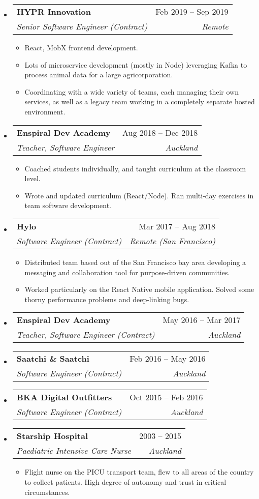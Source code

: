 \documentclass[12pt]{article}
\makeatletter
\def \entryspacing {-0em}
\newcommand{\resumeEntryStart}{\begin{itemize}[leftmargin=2.5mm]}
\newcommand{\resumeEntryEnd}{\end{itemize}\vspace{\entryspacing}}
\newcommand{\resumeItemListStart}{\begin{itemize}[leftmargin=4.5mm]}
\newcommand{\resumeItemListEnd}{\end{itemize}}
\newcommand{\resumeItem}[1]{
  \item\small{
    {#1 \vspace{-0.9ex}}
  }
}
\newcommand{\resumeEntryTSDL}[4]{
  \vspace{-0.5ex}\item[]
    \begin{tabularx}{0.97\textwidth}{X@{\hspace{5em}}r}
      \textbf{\color{primary}#1} & {\firabook\color{accent}\small#2} \\
      \textit{\color{accent}\small#3} & \textit{\color{accent}\small#4} \\
    \end{tabularx}\vspace{-0.9ex}
}
\makeatother
\begin{document}
  \resumeEntryStart
    \resumeEntryTSDL
      {HYPR Innovation}{Feb 2019 -- Sep 2019}
      {Senior Software Engineer (Contract)}{Remote}
    \resumeItemListStart
      \resumeItem {React, MobX frontend development.}
      \resumeItem {Lots of microservice development (mostly in Node) leveraging Kafka to process animal data for a large agricorporation.}
      \resumeItem {Coordinating with a wide variety of teams, each managing their own services, as well as a legacy team working in a completely separate hosted environment.}
    \resumeItemListEnd
  \resumeEntryEnd

  \resumeEntryStart
    \resumeEntryTSDL
      {Enspiral Dev Academy}{Aug 2018 -- Dec 2018}
      {Teacher, Software Engineer}{Auckland}
    \resumeItemListStart
      \resumeItem {Coached students individually, and taught curriculum at the classroom level.}
      \resumeItem {Wrote and updated curriculum (React/Node). Ran multi-day exercises in team software development.}
    \resumeItemListEnd
  \resumeEntryEnd

  \resumeEntryStart
    \resumeEntryTSDL
      {Hylo}{Mar 2017 -- Aug 2018}
      {Software Engineer (Contract)}{Remote (San Francisco)}
    \resumeItemListStart
      \resumeItem {Distributed team based out of the San Francisco bay area developing a messaging and collaboration tool for purpose-driven communities.}
      \resumeItem {Worked particularly on the React Native mobile application. Solved some thorny performance problems and deep-linking bugs.}
    \resumeItemListEnd
  \resumeEntryEnd

  \resumeEntryStart
    \resumeEntryTSDL
      {Enspiral Dev Academy}{May 2016 -- Mar 2017}
      {Teacher, Software Engineer (Contract)}{Auckland}
  \resumeEntryEnd

  \resumeEntryStart
    \resumeEntryTSDL
      {Saatchi \& Saatchi}{Feb 2016 -- May 2016}
      {Software Engineer (Contract)}{Auckland}
  \resumeEntryEnd

  \resumeEntryStart
    \resumeEntryTSDL
      {BKA Digital Outfitters}{Oct 2015 -- Feb 2016}
      {Software Engineer (Contract)}{Auckland}
  \resumeEntryEnd


  \resumeEntryStart
    \resumeEntryTSDL
      {Starship Hospital}{2003 -- 2015}
      {Paediatric Intensive Care Nurse}{Auckland}
    \resumeItemListStart
      \resumeItem {Flight nurse on the PICU transport team, flew to all areas of the country to collect patients. High degree of autonomy and trust in critical circumstances.}
    \resumeItemListEnd
  \resumeEntryEnd
\end{document}
